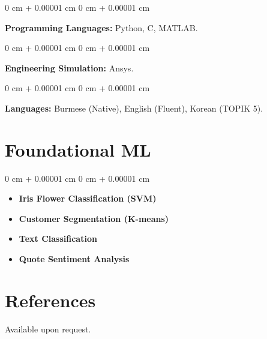 \documentclass[10pt, letterpaper]{article}
\newenvironment{highlights}{
    \begin{itemize}[
        topsep=0.10 cm,
        parsep=0.10 cm,
        partopsep=0pt,
        itemsep=0pt,
        leftmargin=0 cm + 10pt
    ]
}{
    \end{itemize}
} %
\newenvironment{onecolentry}{
    \begin{adjustwidth}{
        0 cm + 0.00001 cm
    }{
        0 cm + 0.00001 cm
    }
}{
    \end{adjustwidth}
} %
\begin{document}
        \begin{onecolentry}
        \textbf{Programming Languages:} Python, C, MATLAB.
        \end{onecolentry}

        \vspace{0.12 cm}

        \begin{onecolentry}
        \textbf{Engineering Simulation:} Ansys.
        \end{onecolentry}

        \vspace{0.12 cm}

        \begin{onecolentry}
        \textbf{Languages:} Burmese (Native), English (Fluent), Korean (TOPIK 5).
        \end{onecolentry}
    \section{Foundational ML}
        \begin{onecolentry}
            \begin{highlights}
                \item \textbf{Iris Flower Classification (SVM)} \href{https://github.com/thurawk/iris-classification}{\faGithub}
                \item \textbf{Customer Segmentation (K-means)} \href{https://github.com/thurawk/customer-segmentation}{\faGithub}
                \item \textbf{Text Classification} \href{https://github.com/thurawk/text-classification}{\faGithub}
                \item \textbf{Quote Sentiment Analysis} \href{https://github.com/thurawk/quote-sentiment-analysis}{\faGithub}
            \end{highlights}
        \end{onecolentry}

\section*{References}
Available upon request.
\end{document}
